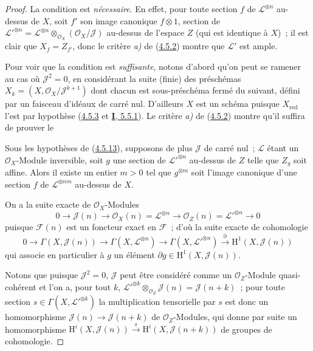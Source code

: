 \begin{proof}
La condition est \emph{nécessaire}. En effet, pour toute section $f$ de
$\mathcal{L}^{\otimes n}$ au-dessus de $X$, soit $f'$ son image canonique
$f\otimes1$, section de
$\mathcal{L}'^{\otimes n}=\mathcal{L}^{\otimes n}
\otimes_{\mathcal{O}_X}(\mathcal{O}_X/\mathcal{J})$ au-dessus de l'espace
$Z$ (qui est identique à $X$)~; il est clair que $X_f=Z_{f'}$, donc le
critère \emph{a)} de (\hyperref[II.4.5.2-fr]{4.5.2}) montre que $\mathcal{L}'$ est
ample.

Pour voir que la condition est \emph{suffisante}, notons d'abord qu'on peut se
ramener au cas où $\mathcal{J}^2=0$, en considérant la suite (finie) des
préschémas
$X_k=(X,\mathcal{O}_X/\mathcal{J}^{k+1})$ dont chacun est sous-préschéma
fermé du suivant, défini par un faisceau d'idéaux de carré nul. D'ailleurs
$X$ est un schéma puisque $X_{\mathrm{red}}$ l'est par hypothèse
(\hyperref[II.4.5.3-fr]{4.5.3} et
\hyperref[I.5.5.1-fr]{\textbf{I}, 5.5.1}). Le critère \emph{a)} de
(\hyperref[II.4.5.2-fr]{4.5.2}) montre qu'il suffira de prouver le

\begin{lemma}[4.5.13.1]
\label{II.4.5.13.1-fr}
Sous les hypothèses de \textup{(\hyperref[II.4.5.13-fr]{4.5.13})}, supposons de plus
$\mathcal{J}$ de carré nul~; $\mathcal{L}$ étant un
$\mathcal{O}_X$-Module inversible, soit $g$ une section de
$\mathcal{L}'^{\otimes n}$ au-dessus de $Z$ telle que $Z_g$ soit affine.
Alors il existe un entier $m>0$ tel que $g^{\otimes m}$ soit l'image
canonique d'une section $f$ de $\mathcal{L}^{\otimes nm}$ au-dessus de $X$.
\end{lemma}

On a la suite exacte de $\mathcal{O}_X$-Modules
\[
  0\longrightarrow\mathcal{J}(n)\longrightarrow
  \mathcal{O}_X(n)=\mathcal{L}^{\otimes n}\longrightarrow
  \mathcal{O}_Z(n)=\mathcal{L}'^{\otimes n}\longrightarrow0
\]
puisque $\mathcal{F}(n)$ est un foncteur exact en $\mathcal{F}$~; d'où la
suite exacte de cohomologie
\[
  0\longrightarrow\Gamma(X,\mathcal{J}(n))\longrightarrow
  \Gamma(X,\mathcal{L}^{\otimes n})\longrightarrow
  \Gamma(X,\mathcal{L}'^{\otimes n})\xrightarrow{\partial}
  \mathrm{H}^1(X,\mathcal{J}(n))
\]
qui associe en particulier à $g$ un élément
$\partial g\in\mathrm{H}^1(X,\mathcal{J}(n))$.

Notons que puisque $\mathcal{J}^2=0$, $\mathcal{J}$ peut être considéré
comme un $\mathcal{O}_Z$-Module quasi-cohérent et l'on a, pour tout $k$,
$\mathcal{L}'^{\otimes k}\otimes_{\mathcal{O}_Z}\mathcal{J}(n)
=\mathcal{J}(n+k)$~; pour toute section
$s\in\Gamma(X,\mathcal{L}'^{\otimes k})$ la multiplication tensorielle par
$s$ est donc un homomorphisme $\mathcal{J}(n)\to\mathcal{J}(n+k)$ de
$\mathcal{O}_Z$-Modules, qui donne par suite un homomorphisme
$\mathrm{H}^i(X,\mathcal{J}(n))\xrightarrow{s}
\mathrm{H}^i(X,\mathcal{J}(n+k))$ de groupes de cohomologie.


\end{proof}
